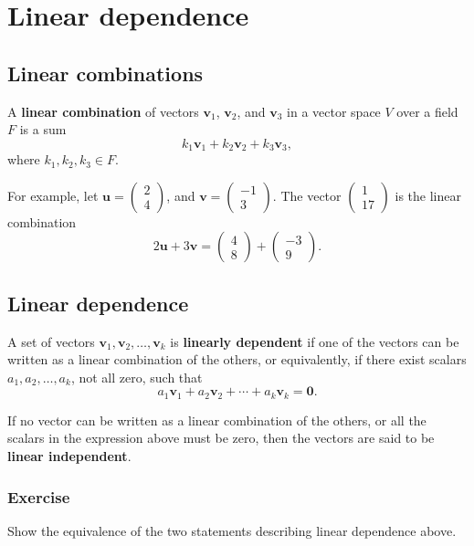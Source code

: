 \documentclass[a4paper,12pt]{amsart}
\begin{document}
    \section{Linear dependence}

    \subsection{Linear combinations}

    A \textbf{linear combination} of vectors $\mathbf{v}_1$, $\mathbf{v}_2$, and  $\mathbf{v}_3$ in a vector space $V$ over a field $F$ is a sum
    \[ k_1 \mathbf{v}_1 + k_2 \mathbf{v}_2 + k_3 \mathbf{v}_3, \]
    where $k_1, k_2, k_3 \in F$.

    For example, let $\mathbf{u} = \begin{pmatrix} 2 \\ 4 \end{pmatrix}$, and $\mathbf{v} = \begin{pmatrix} -1 \\ 3 \end{pmatrix}$. The vector $\begin{pmatrix} 1 \\ 17 \end{pmatrix}$ is the linear combination
    \[ 2 \mathbf{u} + 3 \mathbf{v} = \begin{pmatrix} 4 \\ 8 \end{pmatrix} + \begin{pmatrix} -3 \\ 9 \end{pmatrix}. \]
    
    \subsection{Linear dependence}
    
    A set of vectors $\mathbf{v}_1, \mathbf{v}_2, \ldots, \mathbf{v}_k$ is \textbf{linearly dependent} if one of the vectors can be written as a linear combination of the others, or equivalently, if there exist scalars $a_1, a_2, \ldots, a_k$, not all zero, such that
    \[ a_1 \mathbf{v}_1 + a_2 \mathbf{v}_2 + \cdots + a_k \mathbf{v}_k = \mathbf{0}. \]

    If no vector can be written as a linear combination of the others, or all the scalars in the expression above must be zero, then the vectors are said to be \textbf{linear independent}.

    \subsubsection{Exercise} Show the equivalence of the two statements describing linear dependence above.

\end{document}
